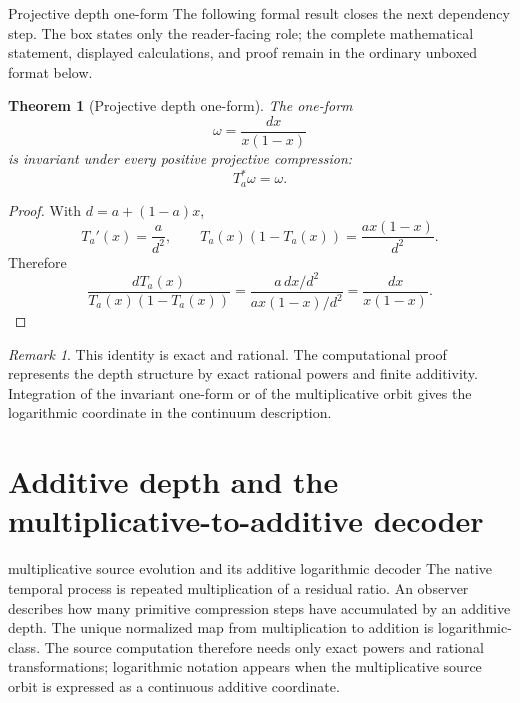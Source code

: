\documentclass[11pt]{article}
\numberwithin{equation}{section}
\newtheorem{theorem}[definition]{Theorem}
\theoremstyle{remark}
\newtheorem{remark}[definition]{Remark}
\begin{document}
\begin{proofguide}{Projective depth one-form}
The following formal result closes the next dependency step. The box states only the reader-facing role; the complete mathematical statement, displayed calculations, and proof remain in the ordinary unboxed format below.
\end{proofguide}
\begin{theorem}[Projective depth one-form]
The one-form
\begin{equation}
\omega=\frac{dx}{x(1-x)}
\end{equation}
is invariant under every positive projective compression:
\begin{equation}
T_a^*\omega=\omega.
\end{equation}
\end{theorem}
\begin{proof}
With $d=a+(1-a)x$,
\begin{equation}
T_a'(x)=\frac{a}{d^2},\qquad
T_a(x)(1-T_a(x))=\frac{a x(1-x)}{d^2}.
\end{equation}
Therefore
\begin{equation}
\frac{dT_a(x)}{T_a(x)(1-T_a(x))}
=\frac{a\,dx/d^2}{a x(1-x)/d^2}
=\frac{dx}{x(1-x)}.
\end{equation}
\end{proof}

\begin{remark}
This identity is exact and rational. The computational proof represents the depth structure by exact rational powers and finite additivity. Integration of the invariant one-form or of the multiplicative orbit gives the logarithmic coordinate in the continuum description.
\end{remark}

\section{Additive depth and the multiplicative-to-additive decoder}
\begin{conceptledger}{multiplicative source evolution and its additive logarithmic decoder}
The native temporal process is repeated multiplication of a residual ratio. An observer describes how many primitive compression steps have accumulated by an additive depth. The unique normalized map from multiplication to addition is logarithmic-class. The source computation therefore needs only exact powers and rational transformations; logarithmic notation appears when the multiplicative source orbit is expressed as a continuous additive coordinate.
\end{conceptledger}
\end{document}

